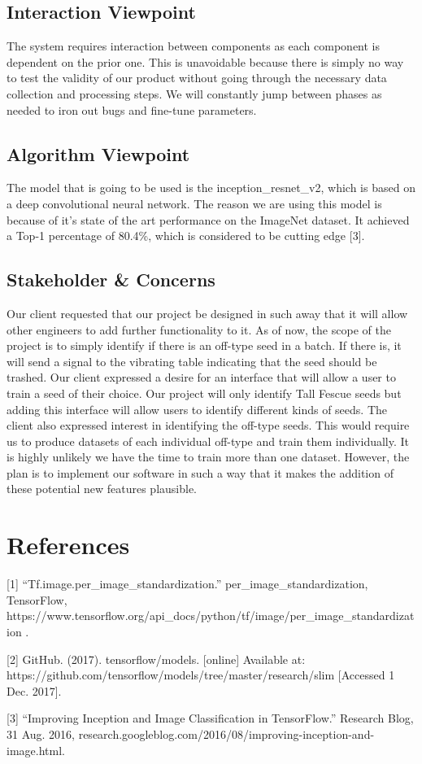 \documentclass[onecolumn, draftclsnofoot,10pt, compsoc]{IEEEtran}
\begin{document}
\subsection{Interaction Viewpoint}
The system requires interaction between components as each component is dependent on the prior one. This is unavoidable because there is simply no way to test the validity of our product without going through the necessary data collection and processing steps. We will constantly jump between phases as needed to iron out bugs and fine-tune parameters.
\subsection{Algorithm Viewpoint}
The model that is going to be used is the inception\_resnet\_v2, which is based on a deep convolutional neural network. The reason we are using this model is because of it's state of the art performance on the ImageNet dataset. It achieved a Top-1 percentage of 80.4\%, which is considered to be cutting edge [3]. 
\subsection{Stakeholder \& Concerns}
Our client requested that our project be designed in such away that it will allow other engineers to add further functionality to it. As of now, the scope of the project is to simply identify if there is an off-type seed in a batch. If there is, it will send a signal to the vibrating table indicating that the seed should be trashed. Our client expressed a desire for an interface that will allow a user to train a seed of their choice. Our project will only identify Tall Fescue seeds but adding this interface will allow users to identify different kinds of seeds. The client also expressed interest in identifying the off-type seeds. This would require us to produce datasets of each individual off-type and train them individually. It is highly unlikely we have the time to train more than one dataset. However, the plan is to implement our software in such a way that it makes the addition of these potential new features plausible. 

\section{References}

[1] “Tf.image.per\_image\_standardization.” per\_image\_standardization, TensorFlow, https://www.tensorflow.org/api\_docs/python/tf/image/per\_image\_standardization . 

[2] GitHub. (2017). tensorflow/models. [online] Available at: https://github.com/tensorflow/models/tree/master/research/slim [Accessed 1 Dec. 2017].

[3] “Improving Inception and Image Classification in TensorFlow.” Research Blog, 31 Aug. 2016, research.googleblog.com/2016/08/improving-inception-and-image.html.
\end{document}
